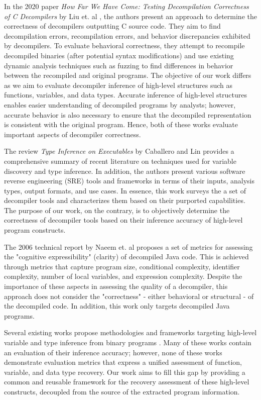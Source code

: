 In the 2020 paper \emph{How Far We Have Come: Testing Decompilation Correctness of C Decompilers} by Liu et. al \cite{bib:how-far-weve-come}, the authors present an approach to determine the correctness of decompilers outputting C source code. They aim to find decompilation errors, recompilation errors, and behavior discrepancies exhibited by decompilers. To evaluate behavioral correctness, they attempt to recompile decompiled binaries (after potential syntax modifications) and use existing dynamic analysis techniques such as fuzzing to find differences in behavior between the recompiled and original programs. The objective of our work differs as we aim to evaluate decompiler inference of high-level structures such as functions, variables, and data types. Accurate inference of high-level structures enables easier understanding of decompiled programs by analysts; however, accurate behavior is also necessary to ensure that the decompiled representation is consistent with the original program. Hence, both of these works evaluate important aspects of decompiler correctness.

The review \emph{Type Inference on Executables} by Caballero and Lin \cite{bib:type-inference-executables} provides a comprehensive summary of recent literature on techniques used for variable discovery and type inference. In addition, the authors present various software reverse engineering (SRE) tools and frameworks in terms of their inputs, analysis types, output formats, and use cases. In essence, this work surveys the a set of decompiler tools and characterizes them based on their purported capabilities. The purpose of our work, on the contrary, is to objectively determine the correctness of decompiler tools based on their inference accuracy of high-level program constructs.

The 2006 technical report by Naeem et. al \cite{bib:metrics-effectiveness-decompilers} proposes a set of metrics for assessing the "cognitive expressibility" (clarity) of decompiled Java code. This is achieved through metrics that capture program size, conditional complexity, identifier complexity, number of local variables, and expression complexity. Despite the importance of these aspects in assessing the quality of a decompiler, this approach does not consider the "correctness" - either behavioral or structural - of the decompiled code. In addition, this work only targets decompiled Java programs.

Several existing works propose methodologies and frameworks targeting high-level variable and type inference from binary programs \cite{bib:divine, bib:tie, bib:artiste, bib:rewards, bib:scalable-variable-datatype-detection, bib:retypd}. Many of these works contain an evaluation of their inference accuracy; however, none of these works demonstrate evaluation metrics that express a unified assessment of function, variable, and data type recovery. Our work aims to fill this gap by providing a common and reusable framework for the recovery assessment of these high-level constructs, decoupled from the source of the extracted program information.

